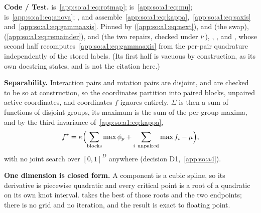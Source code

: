 \begin{sloppypar}
\textbf{Code / Test.} 
is~\eqref{app:so:a1:eq:rotmap}; 
is~\eqref{app:so:a1:eq:mu}; 
is~\eqref{app:so:a1:eq:anova}; ,
 and 
assemble~\eqref{app:so:a1:eq:kappa},~\eqref{app:so:a1:eq:saxis}
and~\eqref{app:so:a1:eq:gammaaxis}. Pinned by
(\eqref{app:so:a1:eq:next}),
and
(the swap),
(\eqref{app:so:a1:eq:remainder}),
and 
(the two repairs, checked under $\nu$),
,
, and
, whose second half
recomputes~\eqref{app:so:a1:eq:gammaaxis} from the per-pair quadrature
independently of the stored labels. (Its first half is vacuous by
construction, as its own docstring states, and is not the citation here.)
\end{sloppypar}

\label{app:so:a1:fstar}

\textbf{Separability.} Interaction pairs and rotation pairs are disjoint, and
are checked to be so at construction, so the coordinates partition into paired
blocks, unpaired active coordinates, and coordinates $f$ ignores entirely.
$\Sigma$ is then a sum of functions of disjoint groups, its maximum is the sum
of the per-group maxima, and by the third invariance
of~\eqref{app:so:a1:eq:kappa},
\begin{equation}\label{app:so:a1:eq:fstar}
  f^\star=\kappa\Bigl(\sum_{\text{blocks}}\max\phi_p
                     +\sum_{i\ \mathrm{unpaired}}\max f_i-\mu\Bigr),
\end{equation}
with no joint search over ${[0,1]}^D$ anywhere (decision D1,~\ref{app:so:a4}).

\textbf{One dimension is closed form.} A component is a cubic spline, so its
derivative is piecewise quadratic and every critical point is a root of a
quadratic on its own knot interval.  takes the best
of those roots and the two endpoints; there is no grid and no iteration, and
the result is exact to floating point.

